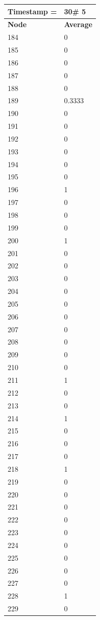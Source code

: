 \begin{tabular}{|l||l|}
\hline
\textbf{Timestamp =} & \textbf{30}\# 5\\\hline
	\textbf{Node} & \textbf{Average} \\ \hline
\hline
	184 & 0 \\ \hline
	185 & 0 \\ \hline
	186 & 0 \\ \hline
	187 & 0 \\ \hline
	188 & 0 \\ \hline
	189 & 0.3333 \\ \hline
	190 & 0 \\ \hline
	191 & 0 \\ \hline
	192 & 0 \\ \hline
	193 & 0 \\ \hline
	194 & 0 \\ \hline
	195 & 0 \\ \hline
	196 & 1 \\ \hline
	197 & 0 \\ \hline
	198 & 0 \\ \hline
	199 & 0 \\ \hline
	200 & 1 \\ \hline
	201 & 0 \\ \hline
	202 & 0 \\ \hline
	203 & 0 \\ \hline
	204 & 0 \\ \hline
	205 & 0 \\ \hline
	206 & 0 \\ \hline
	207 & 0 \\ \hline
	208 & 0 \\ \hline
	209 & 0 \\ \hline
	210 & 0 \\ \hline
	211 & 1 \\ \hline
	212 & 0 \\ \hline
	213 & 0 \\ \hline
	214 & 1 \\ \hline
	215 & 0 \\ \hline
	216 & 0 \\ \hline
	217 & 0 \\ \hline
	218 & 1 \\ \hline
	219 & 0 \\ \hline
	220 & 0 \\ \hline
	221 & 0 \\ \hline
	222 & 0 \\ \hline
	223 & 0 \\ \hline
	224 & 0 \\ \hline
	225 & 0 \\ \hline
	226 & 0 \\ \hline
	227 & 0 \\ \hline
	228 & 1 \\ \hline
	229 & 0 \\ \hline
\end{tabular}
